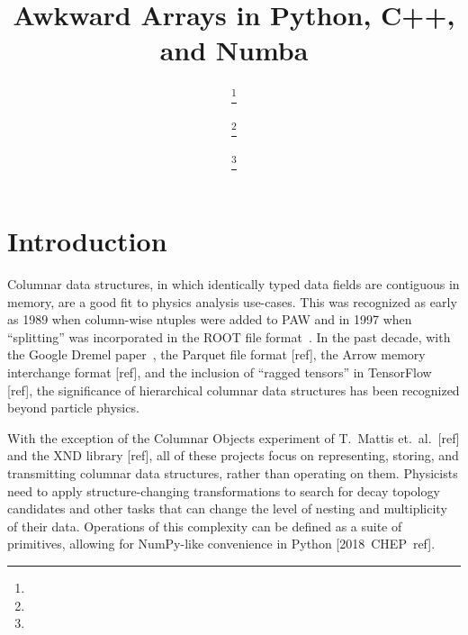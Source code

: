 \documentclass{webofc}
\begin{document}
\title{Awkward Arrays in Python, C++, and Numba}

\author{%
 \fnsep\thanks{} \and
{} \fnsep\thanks{} \and
{} \fnsep\thanks{}}



\maketitle

\section{Introduction}

Columnar data structures, in which identically typed data fields are contiguous in memory, are a good fit to physics analysis use-cases. This was recognized as early as 1989 when column-wise ntuples were added to PAW and in 1997 when ``splitting'' was incorporated in the ROOT file format~\cite{rootio-1997}. In the past decade, with the Google Dremel paper~\cite{dremel}, the Parquet file format [ref], the Arrow memory interchange format [ref], and the inclusion of ``ragged tensors'' in TensorFlow [ref], the significance of hierarchical columnar data structures has been recognized beyond particle physics.

With the exception of the Columnar Objects experiment of T.\ Mattis et.\ al.\ [ref] and the XND library [ref], all of these projects focus on representing, storing, and transmitting columnar data structures, rather than operating on them. Physicists need to apply structure-changing transformations to search for decay topology candidates and other tasks that can change the level of nesting and multiplicity of their data. Operations of this complexity can be defined as a suite of primitives, allowing for NumPy-like convenience in Python \mbox{[2018 CHEP ref].\hspace{-1 cm}}
\end{document}
